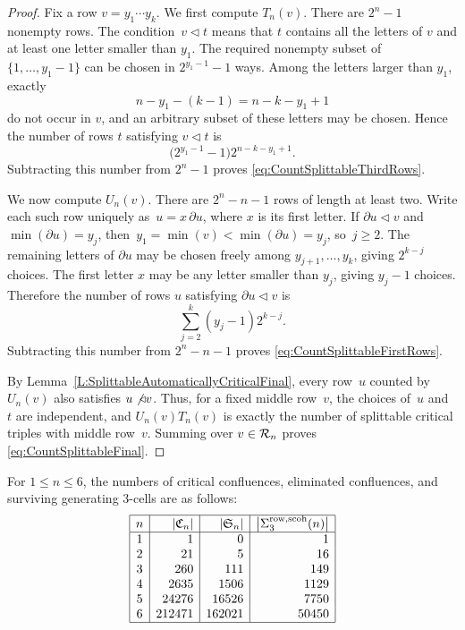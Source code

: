 \documentclass[a4paper, twoside, 11pt, english]{article}
\begin{document}
\begin{proof}
Fix a row $v=y_1\cdots y_k$.
We first compute $T_n(v)$. There are $2^n-1$ nonempty rows. The
condition~$v\triangleleft t$ means that $t$ contains all the letters
of $v$ and at least one letter smaller than $y_1$. The required nonempty subset of
$\{1,\ldots,y_1-1\}$ can be chosen in $2^{y_1-1}-1$ ways.
Among the letters larger than $y_1$, exactly
\[
n-y_1-(k-1)=n-k-y_1+1
\]
do not occur in $v$, and an arbitrary subset of these letters may be
chosen. Hence the number of rows $t$ satisfying $v\triangleleft t$ is
\[
\bigl(2^{y_1-1}-1\bigr)2^{n-k-y_1+1}.
\]
Subtracting this number from $2^n-1$ proves
\eqref{eq:CountSplittableThirdRows}.

 We now compute $U_n(v)$. There are $2^n-n-1$ rows of length at least
two. Write each such row uniquely as~$u=x\,\partial u$, where $x$ is
its first letter.  If $\partial u\triangleleft v$ and
$\min(\partial u)=y_j$, then~$y_1=\min(v)<\min(\partial u)=y_j$,
so~$j\geq2$. The remaining letters of $\partial u$ may be chosen
freely among $y_{j+1},\ldots,y_k$, giving $2^{k-j}$ choices.
The first letter $x$ may be any letter smaller than $y_j$, giving
$y_j-1$ choices. Therefore the number of rows $u$ satisfying
$\partial u\triangleleft v$ is
\[
\sum_{j=2}^k
(y_j-1)2^{k-j}.
\]
Subtracting this number from $2^n-n-1$ proves
\eqref{eq:CountSplittableFirstRows}.

By Lemma~\ref{L:SplittableAutomaticallyCriticalFinal}, every row~$u$
counted by $U_n(v)$ also satisfies $u\not\triangleleft v$. Thus, for
a fixed middle row~$v$, the choices of~$u$ and~$t$ are independent,
and $U_n(v)T_n(v)$ is exactly the number of splittable critical
triples with middle row~$v$. Summing over $v\in\mathcal{R}_n$ proves
\eqref{eq:CountSplittableFinal}.
\end{proof}


\begin{example}
For $1\leq n\leq6$, the numbers of critical confluences, eliminated
confluences, and surviving generating $3$-cells are as follows:
\[
\begin{array}{|c|r|r|r|}
\hline
n
&
|\mathfrak C_n|
&
|\mathfrak S_n|
&
\bigl|\Sigma^{\mathrm{row,scoh}}_3(n)\bigr|
\\ \hline
1&1&0&1\\
2&21&5&16\\
3&260&111&149\\
4&2635&1506&1129\\
5&24276&16526&7750\\
6&212471&162021&50450\\
\hline
\end{array}
\]
\end{example}
\end{document}
